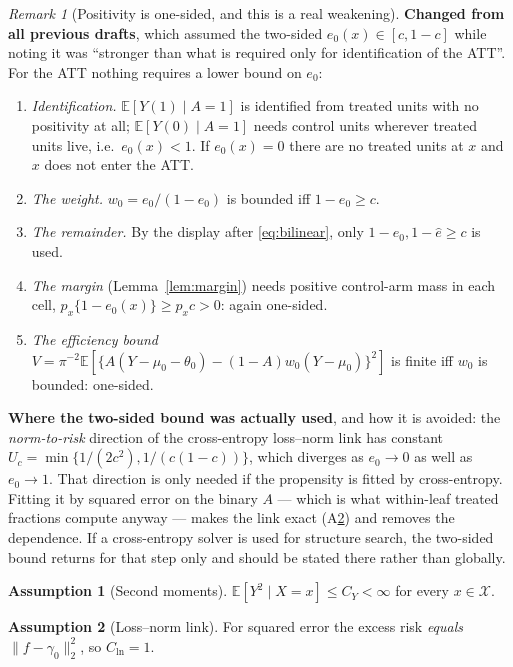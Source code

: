 \documentclass[11pt]{article}
\theoremstyle{plain}
\theoremstyle{definition}
\newtheorem{assumption}{Assumption}
\theoremstyle{remark}
\newtheorem{remark}{Remark}
\newcommand{\E}{\mathbb{E}}
\newcommand{\cX}{\mathcal{X}}
\newcommand{\ez}{e_0}
\newcommand{\mz}{\mu_0}
\newcommand{\wz}{w_0}
\newcommand{\ehat}{\widehat{e}}
\newcommand{\Ltwo}[1]{\lVert #1 \rVert_{2}}
\begin{document}
\begin{remark}[Positivity is one-sided, and this is a real weakening]
\label{rem:positivity}
\textbf{Changed from all previous drafts}, which assumed the two-sided
$\ez(x)\in[c,1-c]$ while noting it was ``stronger than what is required only for
identification of the ATT''. For the ATT nothing requires a lower bound on
$\ez$:
\begin{enumerate}[nosep,label=(\roman*)]
  \item \emph{Identification.} $\E[Y(1)\mid A=1]$ is identified from treated
  units with no positivity at all; $\E[Y(0)\mid A=1]$ needs control units
  wherever treated units live, i.e.\ $\ez(x)<1$. If $\ez(x)=0$ there are no
  treated units at $x$ and $x$ does not enter the ATT.
  \item \emph{The weight.} $\wz=\ez/(1-\ez)$ is bounded iff $1-\ez\ge c$.
  \item \emph{The remainder.} By the display after \eqref{eq:bilinear}, only
  $1-\ez,1-\ehat\ge c$ is used.
  \item \emph{The margin} (Lemma~\ref{lem:margin}) needs positive control-arm
  mass in each cell, $p_x\{1-\ez(x)\}\ge p_xc>0$: again one-sided.
  \item \emph{The efficiency bound} $V=\pi^{-2}\E[\{A(Y-\mz-\theta_0)-(1-A)\wz(Y-\mz)\}^2]$
  is finite iff $\wz$ is bounded: one-sided.
\end{enumerate}
\textbf{Where the two-sided bound was actually used}, and how it is avoided: the
\emph{norm-to-risk} direction of the cross-entropy loss--norm link has constant
$U_c=\min\{1/(2c^2),1/(c(1-c))\}$, which diverges as $\ez\to0$ as well as
$\ez\to1$. That direction is only needed if the propensity is fitted by
cross-entropy. Fitting it by squared error on the binary $A$ --- which is what
within-leaf treated fractions compute anyway --- makes the link exact
(A\ref{ass:lossnorm}) and removes the dependence. If a cross-entropy solver is
used for structure search, the two-sided bound returns for that step only and
should be stated there rather than globally.
\end{remark}

\begin{assumption}[Second moments]\label{ass:moments}
$\E[Y^2\mid X=x]\le C_Y<\infty$ for every $x\in\cX$.
\end{assumption}

\begin{assumption}[Loss--norm link]\label{ass:lossnorm}
For squared error the excess risk \emph{equals} $\Ltwo{f-\gamma_0}^2$, so
$C_{\mathrm{ln}}=1$.
\end{assumption}
\end{document}
